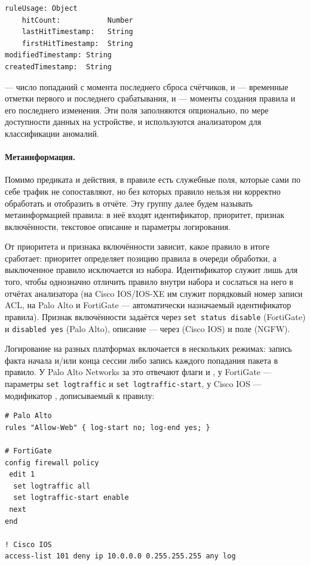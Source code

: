 \begin{lstlisting}[style=schemastyle]
ruleUsage: Object
    hitCount:           Number
    lastHitTimestamp:   String
    firstHitTimestamp:  String
modifiedTimestamp: String
createdTimestamp:  String
\end{lstlisting}

 --- число попаданий с момента последнего сброса счётчиков,  и  --- временные отметки первого и последнего срабатывания,  и  --- моменты создания правила и его последнего изменения. Эти поля заполняются опционально, по мере доступности данных на устройстве, и используются анализатором для классификации аномалий.

\paragraph{Метаинформация.} Помимо предиката и действия, в правиле есть служебные поля, которые сами по себе трафик не сопоставляют, но без которых правило нельзя ни корректно обработать и отобразить в отчёте. Эту группу далее будем называть метаинформацией правила: в неё входят идентификатор, приоритет, признак включённости, текстовое описание и параметры логирования.

От приоритета и признака включённости зависит, какое правило в итоге сработает: приоритет определяет позицию правила в очереди обработки, а выключенное правило исключается из набора. Идентификатор служит лишь для того, чтобы однозначно отличить правило внутри набора и сослаться на него в отчётах анализатора (на Cisco IOS/IOS-XE им служит порядковый номер записи ACL, на Palo Alto и FortiGate --- автоматически назначаемый идентификатор правила). Признак включённости задаётся через \texttt{set status disable} (FortiGate) и \texttt{disabled yes} (Palo Alto), описание --- через  (Cisco IOS) и поле  (NGFW).

Логирование на разных платформах включается в нескольких режимах: запись факта начала и/или конца сессии либо запись каждого попадания пакета в правило. У Palo Alto Networks за это отвечают флаги  и , у FortiGate --- параметры \texttt{set logtraffic} и \texttt{set logtraffic-start}, у Cisco IOS --- модификатор , дописываемый к правилу:

\begin{verbatim}
# Palo Alto
rules "Allow-Web" { log-start no; log-end yes; }

# FortiGate
config firewall policy
 edit 1
  set logtraffic all
  set logtraffic-start enable
 next
end

! Cisco IOS
access-list 101 deny ip 10.0.0.0 0.255.255.255 any log
\end{verbatim}

